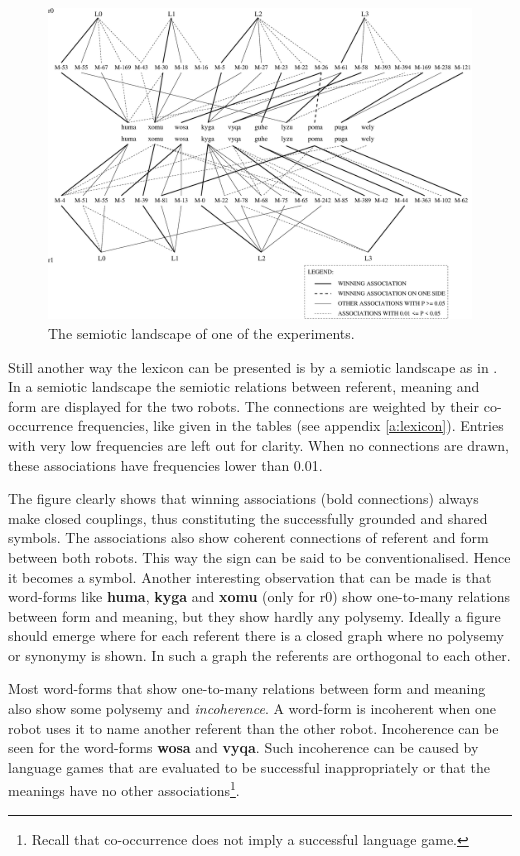 \begin{figure}[t]
\centerline{\includegraphics[width=12cm]{basic/semiotic.eps}}
\caption{The semiotic landscape of one of the experiments.}
\label{f:st:semiotic}
\end{figure}

Still another way the lexicon can be presented is by a semiotic landscape as in . In a semiotic landscape the semiotic relations between referent, meaning and form are displayed for the two robots. The connections are weighted by their co-occurrence frequencies, like given in the tables (see appendix \ref{a:lexicon}). Entries with very low frequencies are left out for clarity. When no connections are drawn, these associations have frequencies lower than 0.01.

The figure clearly shows that winning associations (bold connections) always make closed couplings, thus constituting the successfully grounded and shared symbols. The associations also show coherent connections of referent and form between both robots. This way the sign can be said to be conventionalised. Hence it becomes a symbol. Another interesting observation that can be made is that word-forms like {\bf huma}, {\bf kyga} and {\bf xomu} (only for r0) show one-to-many relations between form and meaning, but they show hardly any polysemy. Ideally a figure should emerge where for each referent there is a closed graph where no polysemy or synonymy is shown. In such a graph the referents are orthogonal to each other.

Most word-forms that show one-to-many relations between form and meaning also show some polysemy and {\em incoherence}. A word-form is incoherent when one robot uses it to name another referent than the other robot. Incoherence can be seen for the word-forms {\bf wosa} and {\bf vyqa}. Such incoherence can be caused by language games that are evaluated to be successful inappropriately or that the meanings have no other associations\footnote{Recall that co-occurrence does not imply a successful language game.}.

